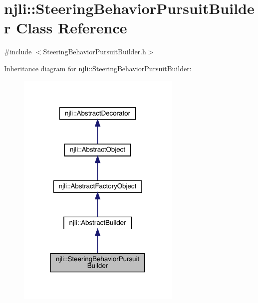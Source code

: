 \hypertarget{classnjli_1_1_steering_behavior_pursuit_builder}{}\section{njli\+:\+:Steering\+Behavior\+Pursuit\+Builder Class Reference}
\label{classnjli_1_1_steering_behavior_pursuit_builder}


{\ttfamily \#include $<$Steering\+Behavior\+Pursuit\+Builder.\+h$>$}



Inheritance diagram for njli\+:\+:Steering\+Behavior\+Pursuit\+Builder\+:\nopagebreak
\begin{figure}[H]
\begin{center}
\leavevmode
\includegraphics[width=222pt]{classnjli_1_1_steering_behavior_pursuit_builder__inherit__graph}
\end{center}
\end{figure}


